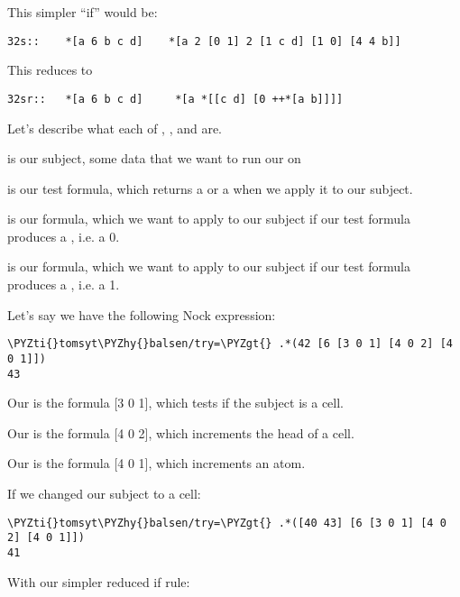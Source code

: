 This simpler ``if'' would be:

\begin{framed_shaded}
\begin{Verbatim}[fontsize=\relsize{-2.5},commandchars=\\\{\}]
32s::    *[a 6 b c d]    *[a 2 [0 1] 2 [1 c d] [1 0] [4 4 b]]
\end{Verbatim}
\end{framed_shaded}
This reduces to

\begin{framed_shaded}
\begin{Verbatim}[fontsize=\relsize{-2.5},commandchars=\\\{\}]
32sr::   *[a 6 b c d]     *[a *[[c d] [0 ++*[a b]]]]
\end{Verbatim}
\end{framed_shaded}
Let's describe what each of , ,  and  are.

 is our subject, some data that we want to run our  on

 is our test formula, which returns a  or a  when we apply it to our subject.

 is our  formula, which we want to apply to our subject if our test formula produces a , i.e. a 0.

 is our  formula, which we want to apply to our subject if our test formula produces a , i.e. a 1.

Let's say we have the following Nock expression:

\begin{framed_shaded}
\begin{Verbatim}[fontsize=\relsize{-2.5},commandchars=\\\{\}]
\PYZti{}tomsyt\PYZhy{}balsen/try=\PYZgt{} .*(42 [6 [3 0 1] [4 0 2] [4 0 1]])
43
\end{Verbatim}
\end{framed_shaded}
Our  is the formula [3 0 1], which tests if the subject is a cell.

Our  is the formula [4 0 2], which increments the head of a cell.

Our  is the formula [4 0 1], which increments an atom.

If we changed our subject to a cell:

\begin{framed_shaded}
\begin{Verbatim}[fontsize=\relsize{-2.5},commandchars=\\\{\}]
\PYZti{}tomsyt\PYZhy{}balsen/try=\PYZgt{} .*([40 43] [6 [3 0 1] [4 0 2] [4 0 1]])
41
\end{Verbatim}
\end{framed_shaded}
With our simpler reduced if rule:

